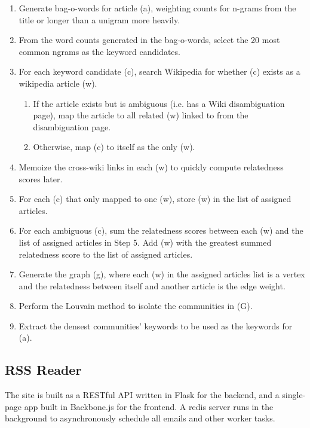 \documentclass[11pt]{article}
\begin{document}
\begin{enumerate}

\item Generate bag-o-words for article (a), weighting counts for n-grams from the title or longer than a unigram more heavily.
\item From the word counts generated in the bag-o-words, select the 20 most common ngrams as the keyword candidates.
\item For each keyword candidate (c), search Wikipedia for whether (c) exists as a wikipedia article (w).
  \begin{enumerate}
  \item If the article exists but is ambiguous (i.e. has a Wiki disambiguation page), map the article to all related (w) linked to from the disambiguation page.
  \item Otherwise, map (c) to itself as the only (w).
  \end{enumerate}
\item Memoize the cross-wiki links in each (w) to quickly compute relatedness scores later.
\item For each (c) that only mapped to one (w), store (w) in the list of assigned articles.
\item For each ambiguous (c), sum the relatedness scores between each (w) and the list of assigned articles in Step 5. Add (w) with the greatest summed relatedness score to the list of assigned articles.
\item Generate the graph (g), where each (w) in the assigned articles list is a vertex and the relatedness between itself and another article is the edge weight.
\item Perform the Louvain method to isolate the communities in (G).
\item Extract the densest communities' keywords to be used as the keywords for (a).
\end{enumerate}


\subsection{RSS Reader}

The site is built as a RESTful API written in Flask for the backend, and a single-page app built in Backbone.js for the frontend. A redis server runs in the background to asynchronously schedule all emails and other worker tasks.

\end{document}
